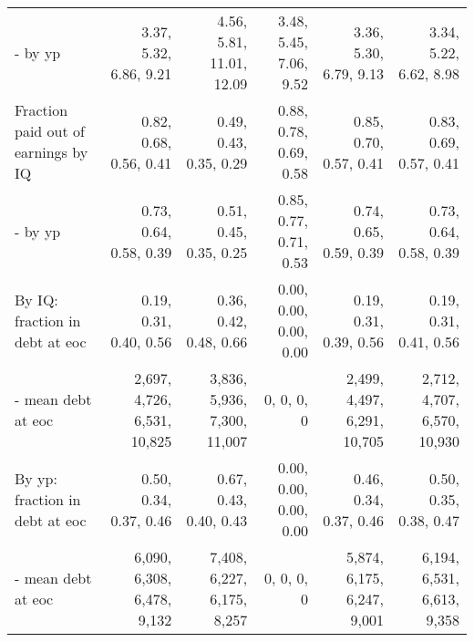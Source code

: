 \begin{tabular}{lrrrrr}
- by yp & 3.37, 5.32, 6.86, 9.21  & 4.56, 5.81, 11.01, 12.09  & 3.48, 5.45, 7.06, 9.52  & 3.36, 5.30, 6.79, 9.13  & 3.34, 5.22, 6.62, 8.98  \\ 
Fraction paid out of earnings by IQ & 0.82, 0.68, 0.56, 0.41  & 0.49, 0.43, 0.35, 0.29  & 0.88, 0.78, 0.69, 0.58  & 0.85, 0.70, 0.57, 0.41  & 0.83, 0.69, 0.57, 0.41  \\ 
- by yp & 0.73, 0.64, 0.58, 0.39  & 0.51, 0.45, 0.35, 0.25  & 0.85, 0.77, 0.71, 0.53  & 0.74, 0.65, 0.59, 0.39  & 0.73, 0.64, 0.58, 0.39  \\ 
By IQ: fraction in debt at eoc & 0.19, 0.31, 0.40, 0.56  & 0.36, 0.42, 0.48, 0.66  & 0.00, 0.00, 0.00, 0.00  & 0.19, 0.31, 0.39, 0.56  & 0.19, 0.31, 0.41, 0.56  \\ 
- mean debt at eoc & 2,697, 4,726, 6,531, 10,825  & 3,836, 5,936, 7,300, 11,007  & 0, 0, 0, 0  & 2,499, 4,497, 6,291, 10,705  & 2,712, 4,707, 6,570, 10,930  \\ 
By yp: fraction in debt at eoc & 0.50, 0.34, 0.37, 0.46  & 0.67, 0.43, 0.40, 0.43  & 0.00, 0.00, 0.00, 0.00  & 0.46, 0.34, 0.37, 0.46  & 0.50, 0.35, 0.38, 0.47  \\ 
- mean debt at eoc & 6,090, 6,308, 6,478, 9,132  & 7,408, 6,227, 6,175, 8,257  & 0, 0, 0, 0  & 5,874, 6,175, 6,247, 9,001  & 6,194, 6,531, 6,613, 9,358  \\ 
\hline
\end{tabular}%
